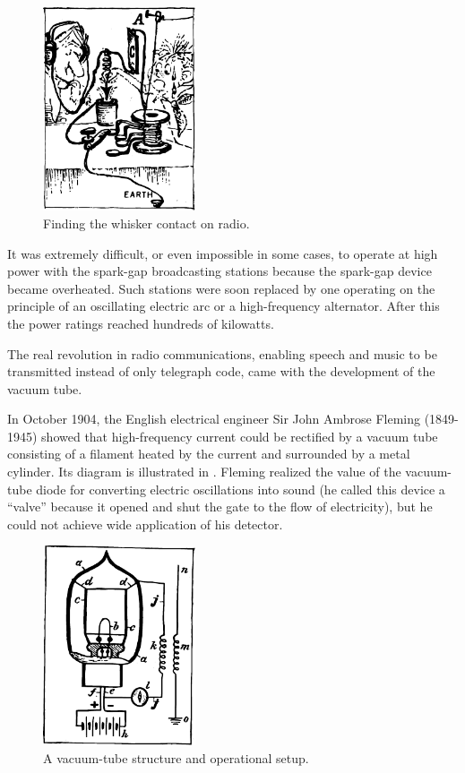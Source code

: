 \begin{figure}[!ht]
\centering
\includegraphics[width=0.4\textwidth]{figures/fig-06-03.pdf}
\caption{Finding the whisker contact on radio.}
\label{fig-6.3}
\end{figure}

It was extremely difficult, or even impossible in some cases, to operate at high power with the spark-gap broadcasting stations because the spark-gap device became overheated. Such stations were soon replaced by one operating on the principle of an oscillating electric arc or a high-frequency alternator. After this the power ratings reached hundreds of kilowatts.

The real revolution in radio communications, enabling speech and music to be transmitted instead of only telegraph code, came with the development of the vacuum tube.

In October 1904, the English electrical engineer Sir John Ambrose Fleming (1849-1945) showed that high-frequency current could be rectified by a vacuum tube consisting of a filament heated by the current and surrounded by a metal cylinder. Its diagram is illustrated in . Fleming realized the value of the vacuum-tube diode for converting electric oscillations into sound (he called this device a ``valve'' because it opened and shut the gate to the flow of electricity), but he could not achieve wide application of his detector.

\begin{figure}[!ht]
\centering
\includegraphics[width=0.4\textwidth]{figures/fig-06-04.pdf}
\caption{A vacuum-tube structure and operational setup.}
\label{fig-6.4}
\end{figure}



